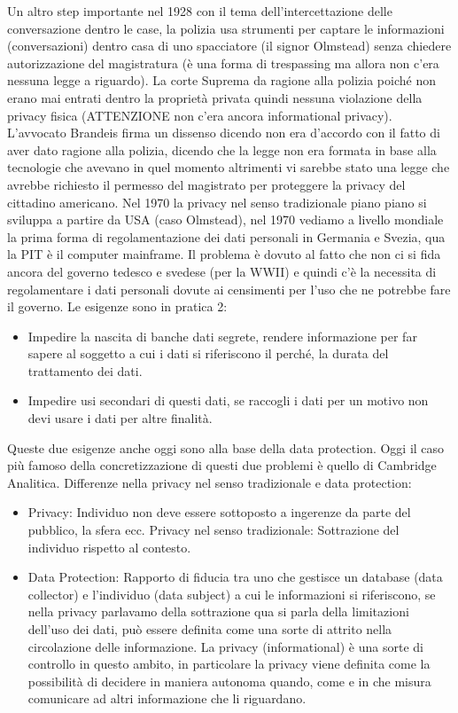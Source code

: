 \documentclass[a4page, 11pt, twocolumn]{article}
\begin{document}
Un altro step importante nel 1928 con il tema dell’intercettazione delle conversazione dentro le case, la polizia usa strumenti per captare le informazioni (conversazioni) dentro casa di uno spacciatore (il signor Olmstead) senza chiedere autorizzazione del magistratura (è una forma di trespassing ma allora non c’era nessuna legge a riguardo). La corte Suprema da ragione alla polizia poiché non erano mai entrati dentro la proprietà privata quindi nessuna violazione della privacy fisica (ATTENZIONE non c’era ancora informational privacy). L’avvocato Brandeis firma un dissenso dicendo non era d’accordo con il fatto di aver dato ragione alla polizia, dicendo che la legge non era formata in base alla tecnologie che avevano in quel momento altrimenti vi sarebbe stato una legge che avrebbe richiesto il permesso del magistrato per proteggere la privacy del cittadino americano. \newline
Nel 1970 la privacy nel senso tradizionale piano piano si sviluppa a partire da USA (caso Olmstead), nel 1970 vediamo a livello mondiale la prima forma di regolamentazione dei dati personali in Germania e Svezia, qua la PIT è il computer mainframe. Il problema è dovuto al fatto che non ci si fida ancora del governo tedesco e svedese (per la WWII) e quindi c’è la necessita di regolamentare i dati personali dovute ai censimenti per l’uso che ne potrebbe fare il governo. Le esigenze sono in pratica 2:
\begin{itemize}
  \item Impedire la nascita di banche dati segrete, rendere informazione per far sapere al soggetto a cui i dati si riferiscono il perché, la durata del trattamento dei dati.
  \item Impedire usi secondari di questi dati, se raccogli i dati per un motivo non devi usare i dati per altre finalità.
\end{itemize}
Queste due esigenze anche oggi sono alla base della data protection. Oggi il caso più famoso della concretizzazione di questi due problemi è quello di Cambridge Analitica. \newline
Differenze nella privacy nel senso tradizionale e data protection:
\begin{itemize}
  \item Privacy: Individuo non deve essere sottoposto a ingerenze da parte del pubblico, la sfera ecc. \newline
    Privacy nel senso tradizionale: Sottrazione del individuo rispetto al contesto.
  \item Data Protection: Rapporto di fiducia tra uno che gestisce un database (data collector) e l’individuo (data subject) a cui le informazioni si riferiscono, se nella privacy parlavamo della sottrazione qua si parla della limitazioni dell’uso dei dati, può essere definita come una sorte di attrito nella circolazione delle informazione. La privacy (informational) è una sorte di controllo in questo ambito, in particolare la privacy viene definita come la possibilità di decidere in maniera autonoma quando, come e in che misura comunicare ad altri informazione che li riguardano. 
\end{itemize}
\end{document}
